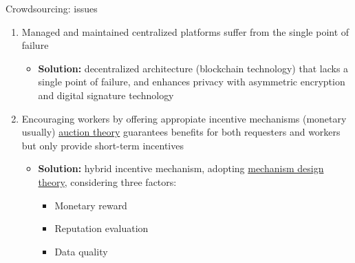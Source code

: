 \begin{frame}{Crowdsourcing: issues}
  		\begin{enumerate}
   			\item Managed and maintained \alert{centralized platforms} suffer from the single point of failure
   				\begin{itemize}
   					\item \textbf{Solution: } decentralized architecture (blockchain technology) that lacks a single point of failure, and enhances privacy with asymmetric encryption and digital signature technology
   				\end{itemize}
    		\item Encouraging workers by offering appropiate \alert{incentive mechanisms} (monetary usually) \rightarrow  \underline{auction theory} guarantees benefits for both requesters and workers\cite{electronics9020215} but only provide short-term incentives
    			\begin{itemize}
   					\item \textbf{Solution:} hybrid incentive mechanism, adopting \underline{mechanism design theory}, considering three factors:
   					\begin{itemize}
   					\item Monetary reward
   					\item Reputation evaluation
   					\item Data quality
   					\end{itemize}
   				\end{itemize}
  		\end{enumerate}
\end{frame}